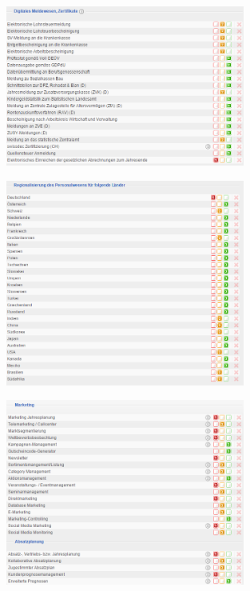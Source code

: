 \documentclass[12pt]{article}
\begin{document}
\noindent
\begin{figure}[!h]
\centering
\includegraphics[width=0.7\textwidth]{images/tr8}
\end{figure}\FloatBarrier
\noindent
\begin{figure}[!h]
\centering
\includegraphics[width=0.7\textwidth]{images/tr9}
\end{figure}\FloatBarrier
\noindent
\begin{figure}[!h]
\centering
\includegraphics[width=0.7\textwidth]{images/tr10}
\end{figure}\FloatBarrier
\end{document}

